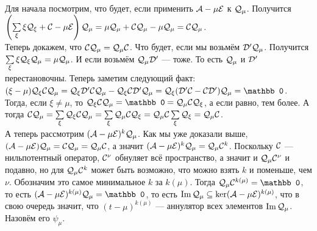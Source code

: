 \documentclass{article}
\DeclareMathOperator{\operIm}{Im}
\let\Im\operIm
\newcommand{\id}{{\mathcal{E}}}
\begin{document}
\begin{itemize}
\begin{Proof}
\begin{enumerate}
\begin{itemize}
                \end{itemize}
            \end{enumerate}
            Для начала посмотрим, что будет, если применить $\scriptA-\mu\id$ к ${\mathcal{Q}}_\mu$. Получится $\left(\sum\limits_\xi\xi\scriptQ_\xi+\scriptC-\mu\id\right)\scriptQ_\mu=\mu\scriptQ_\mu+\scriptC\scriptQ_\mu-\mu\scriptQ_\mu=\scriptC\scriptQ_\mu$.\\
            Теперь докажем, что ${\mathcal{C}}{\mathcal{Q}}_\mu={\mathcal{Q}}_\mu{\mathcal{C}}$. Что будет, если мы возьмём ${\mathcal{D}}'{\mathcal{Q}}_\mu$. Получится $\sum\limits_\xi\xi{\mathcal{Q}}_\xi{\mathcal{Q}}_\mu=\mu{\mathcal{Q}}_\mu$. И если возьмём ${\mathcal{Q}}_\mu{\mathcal{D}}'$ --- тоже. То есть ${\mathcal{Q}}_\mu$ и ${\mathcal{D}}'$ перестановочны. Теперь заметим следующий факт: $(\xi-\mu)\scriptQ_\xi\scriptC\scriptQ_\mu=\scriptQ_\xi\scriptD'\scriptC\scriptQ_\mu-\scriptQ_\xi\scriptC\scriptD'\scriptQ_\mu=\scriptQ_\xi(\scriptD'\scriptC-\scriptC\scriptD')\scriptQ_\mu=\mathbb0$. Тогда, если $\xi\neq\mu$, то $\scriptQ_\xi\scriptC\scriptQ_\mu=\mathbb0=\scriptQ_\mu\scriptC\scriptQ_\xi$, а если равно, тем более. А тогда ${\mathcal{C}}{\mathcal{Q}}_\mu=\sum\limits_{\xi}{\mathcal{Q}}_\xi{\mathcal{C}}{\mathcal{Q}}_\mu=\sum\limits_{\xi}{\mathcal{Q}}_\mu{\mathcal{C}}{\mathcal{Q}}_\xi={\mathcal{Q}}_\mu{\mathcal{C}}\sum\limits_{\xi}{\mathcal{Q}}_\xi={\mathcal{Q}}_\mu{\mathcal{C}}$.\\
            А теперь рассмотрим $(\scriptA-\mu\id)^k\scriptQ_\mu$. Как мы уже доказали выше, $(\scriptA-\mu\id)\scriptQ_\mu=\scriptC\scriptQ_\mu=\scriptQ_\mu\scriptC$, а значит $(\scriptA-\mu\id)^k\scriptQ_\mu=\scriptQ_\mu\scriptC^k$. Поскольку ${\mathcal{C}}$ --- нильпотентный оператор, ${\mathcal{C}}^\nu$ обнуляет всё пространство, а значит и ${\mathcal{Q}}_\mu{\mathcal{C}}^\nu$ и подавно, но для ${\mathcal{Q}}_\mu{\mathcal{C}}^k$ может быть возможно, что можно взять $k$ и поменьше, чем $\nu$. Обозначим это самое минимальное $k$ за $k(\mu)$. Тогда $\scriptQ_\mu\scriptC^{k(\mu)}=\mathbb0$, то есть $(\scriptA-\mu\id)^{k(\mu)}\scriptQ_\mu=\mathbb0$, то есть $\Im\scriptQ_\mu\subseteq\ker(\scriptA-\mu\id)^{k(\mu)}$, что в свою очередь значит, что $(t-\mu)^{k(\mu)}$ --- аннулятор всех элементов $\Im\scriptQ_\mu$. Назовём его $\psi_\mu$.\\

\end{Proof}
\end{itemize}
\end{document}
